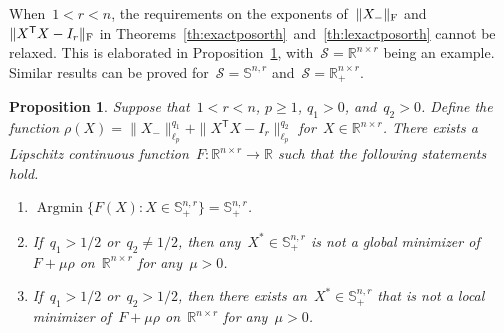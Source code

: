 \documentclass[11pt,a4paper]{article}  %
\newtheorem{proposition}{Proposition}%
\theoremstyle{definition}
\DeclareMathOperator*{\Argmin}{Argmin}
\newcommand{\RR}{\mathbb{R}}
\newcommand{\sset}{\mathcal{S}}
\newcommand{\res}{\rho}
\newcommand{\penpar}{\mu}
\newcommand{\col}{r}
\newcommand{\stf}[1]{\mathbb{S}^{#1}}
\newcommand{\fro}{{\scriptstyle{\textnormal{F}}}}
\newcommand{\trs}{{\scriptstyle{\mathsf{T}}}}
\begin{document}
When~$1 < \col <n$, the requirements on the exponents of~$\|X_{-}\|_\fro$ and~$\|X^\trs X - I_\col\|_\fro$
in Theorems~\mbox{\ref{th:exactposorth} and~\ref{th:lexactposorth}} cannot be relaxed.
This is elaborated in Proposition~\ref{prop:nonexact}, with~$\sset = \RR^{n\times \col}$ being an
example. Similar results can be proved for~$\sset = \stf{n,\col}$ and~$\sset = \RR^{n\times \col}_+$.
\begin{proposition}
    \label{prop:nonexact}
    Suppose that~$1 < \col < n$, $p \ge 1$, $q_1 > 0$, and~$q_2 > 0$.
    Define the function
    $\res(X) = \|X_{-}\|_{\ell_p}^{q_1} + \|X^\trs X - I_\col\|_{\ell_p}^{q_2}$
    for~$X\in\RR^{n\times \col}$.
    There exists a Lipschitz continuous function~$F\mathrel{:} \RR^{n\times \col} \to \RR$ such
    that the following statements hold.
    \begin{enumerate}%
    \item\label{it:min}
        $\Argmin\{F(X) \mathrel{:} X\in\stf{n,\col}_+\} =
        \stf{n,\col}_+$.
    \item\label{it:argmin}
        If~$q_1 > 1/2$ or~$q_2 \neq 1/2$, then any~$X^*\in\stf{n,\col}_+$ is not
        a global minimizer of~$F + \penpar \res$
        on~$\RR^{n\times \col}$ for any~$\penpar >0$.
    \item\label{it:arglocmin}If~$q_1 > 1/2$ or~$q_2 > 1/2$, then there exists an~$X^*\in\stf{n,\col}_+$ that is
        not a local minimizer of~$F + \penpar\res$
        on~$\RR^{n\times \col}$ for any~$\penpar >0$.
\end{enumerate}
\end{proposition}
\end{document}
